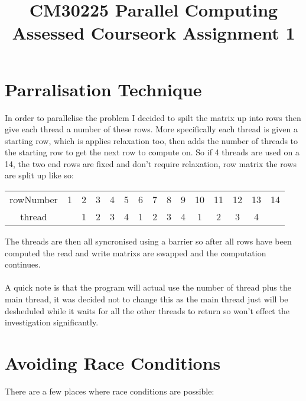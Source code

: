 \documentclass{article}
\begin{document}
\title{CM30225 Parallel Computing \\ Assessed Courseork Assignment 1}
\author{}

\maketitle

\section{Parralisation Technique}
In order to parallelise the problem I decided to spilt the matrix up into rows
then give each thread a number of these rows. More specifically each thread is
given a starting row, which is applies relaxation too, then adds the number of
threads to the starting row to get the next row to compute on. So if 4 threads
are used on a 14, the two end rows are fixed and don't require relaxation,
row matrix the rows are split up like so:

\begin{center}
\begin{tabular}{ |c|c|c|c|c|c|c|c|c|c|c|c|c|c|c| }
 \hline
 rowNumber & 1 & 2 & 3 & 4 & 5 & 6 & 7 & 8 & 9 & 10 & 11 & 12 & 13 & 14 \\
 thread &  & 1 & 2 & 3 & 4 & 1 & 2 & 3 & 4 & 1 & 2 & 3 & 4 &  \\
 \hline
\end{tabular}
\end{center}

The threads are then all syncronised using a barrier so after all rows have been
computed the read and write matrixs are swapped and the computation continues.\\~\\
A quick note is that the program will actual use the number of thread plus the
main thread, it was decided not to change this as the main thread just will be
desheduled while it waits for all the other threads to return so won't effect
the investigation significantly.

\section{Avoiding Race Conditions}
There are a few places where race conditions are possible:
\end{document}
